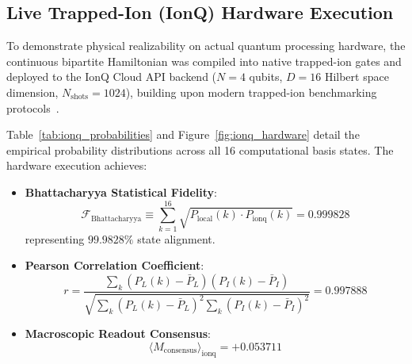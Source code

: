 \documentclass[10pt,twocolumn,3p]{article}
\begin{document}
\subsection{Live Trapped-Ion (IonQ) Hardware Execution}
\label{subsec:bench_ionq}

To demonstrate physical realizability on actual quantum processing hardware, the continuous bipartite Hamiltonian was compiled into native trapped-ion gates and deployed to the IonQ Cloud API backend ($N = 4$ qubits, $D = 16$ Hilbert space dimension, $N_{\text{shots}} = 1024$), building upon modern trapped-ion benchmarking protocols~\cite{wright2019}.

Table~\ref{tab:ionq_probabilities} and Figure~\ref{fig:ionq_hardware} detail the empirical probability distributions across all 16 computational basis states. The hardware execution achieves:
\begin{itemize}
    \item \textbf{Bhattacharyya Statistical Fidelity}:
    \begin{equation}
        \mathcal{F}_{\text{Bhattacharyya}} \equiv \sum_{k=1}^{16} \sqrt{P_{\text{local}}(k) \cdot P_{\text{ionq}}(k)} = \mathbf{0.999828}
    \end{equation}
    representing $99.9828\%$ state alignment.
    \item \textbf{Pearson Correlation Coefficient}:
    \begin{equation}
        r = \frac{\sum_k (P_L(k) - \bar{P}_L)(P_I(k) - \bar{P}_I)}{\sqrt{\sum_k (P_L(k) - \bar{P}_L)^2 \sum_k (P_I(k) - \bar{P}_I)^2}} = \mathbf{0.997888}
    \end{equation}
    \item \textbf{Macroscopic Readout Consensus}:
    \begin{equation}
        \langle M_{\text{consensus}} \rangle_{\text{ionq}} = +0.053711
    \end{equation}
\end{itemize}
\end{document}

